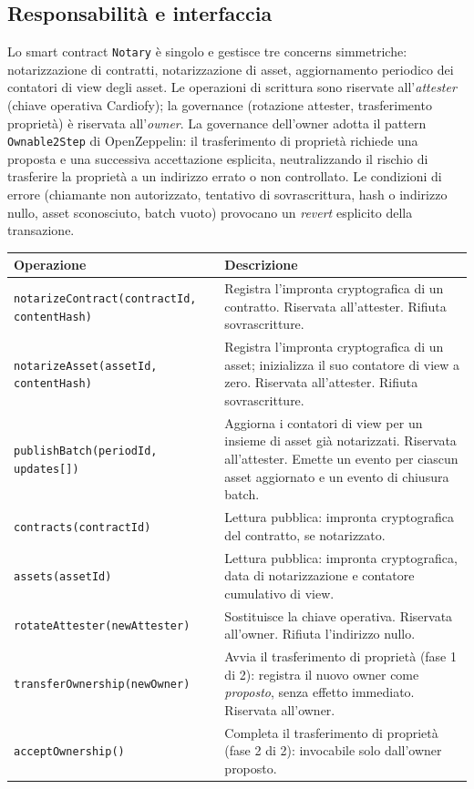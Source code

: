 \documentclass[a4paper,11pt]{article}
\begin{document}
\subsection{Responsabilit\`a e interfaccia}

Lo smart contract \texttt{Notary} \`e singolo e gestisce tre concerns simmetriche: notarizzazione di contratti, notarizzazione di asset, aggiornamento periodico dei contatori di view degli asset. Le operazioni di scrittura sono riservate all'\emph{attester} (chiave operativa Cardiofy); la governance (rotazione attester, trasferimento propriet\`a) \`e riservata all'\emph{owner}. La governance dell'owner adotta il pattern \texttt{Ownable2Step} di OpenZeppelin: il trasferimento di propriet\`a richiede una proposta e una successiva accettazione esplicita, neutralizzando il rischio di trasferire la propriet\`a a un indirizzo errato o non controllato. Le condizioni di errore (chiamante non autorizzato, tentativo di sovrascrittura, hash o indirizzo nullo, asset sconosciuto, batch vuoto) provocano un \emph{revert} esplicito della transazione.

\begin{center}
\begin{tabularx}{\textwidth}{lX}
\toprule
\textbf{Operazione} & \textbf{Descrizione} \\
\midrule
\texttt{notarizeContract(contractId, contentHash)} & Registra l'impronta cryptografica di un contratto. Riservata all'attester. Rifiuta sovrascritture. \\
\texttt{notarizeAsset(assetId, contentHash)} & Registra l'impronta cryptografica di un asset; inizializza il suo contatore di view a zero. Riservata all'attester. Rifiuta sovrascritture. \\
\texttt{publishBatch(periodId, updates[])} & Aggiorna i contatori di view per un insieme di asset gi\`a notarizzati. Riservata all'attester. Emette un evento per ciascun asset aggiornato e un evento di chiusura batch. \\
\texttt{contracts(contractId)} & Lettura pubblica: impronta cryptografica del contratto, se notarizzato. \\
\texttt{assets(assetId)} & Lettura pubblica: impronta cryptografica, data di notarizzazione e contatore cumulativo di view. \\
\texttt{rotateAttester(newAttester)} & Sostituisce la chiave operativa. Riservata all'owner. Rifiuta l'indirizzo nullo. \\
\texttt{transferOwnership(newOwner)} & Avvia il trasferimento di propriet\`a (fase 1 di 2): registra il nuovo owner come \emph{proposto}, senza effetto immediato. Riservata all'owner. \\
\texttt{acceptOwnership()} & Completa il trasferimento di propriet\`a (fase 2 di 2): invocabile solo dall'owner proposto. \\
\bottomrule
\end{tabularx}
\end{center}
\end{document}

